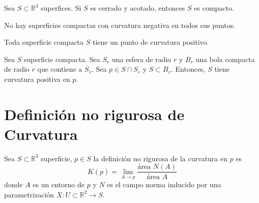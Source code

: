 \begin{defn}
  Sea $S \subset \mathbb{R}^{3}$ superfices. Si $S$ es cerrado y acotado, entonces $S$ es compacto. 
\end{defn}

\begin{prop}
  No hay superficies compactas con curvatura negativa en todos sus puntos.
\end{prop}

\begin{dem}
\end{dem}

\begin{prop}
  Toda superficie compacta $S$ tiene un punto de curvatura positivo.
\end{prop}

\begin{prop}
  Sea $S$ superficie compacta. Sea $S_{r}$ una esfera de radio $r$ y $B_{r}$ una bola compacta de radio $r$ que contiene a $S_{r}$. Sea $ p \in S \cap S_{r}$ y $ S \subset B_{r}$. Entonces, $S$ tiene curvatura positiva en $p$.
\end{prop}

\section{Definición no rigurosa de Curvatura}

\begin{nota}
  Sea $S \subset \mathbb{R}^{3}$ superficie, $p \in S$ la definición no rigurosa de la curvatura en $p$ es
  \[ 
    K(p) = \lim_{A \to p} \frac{\text{área } N(A)}{\text{área } A}
  \] 
  donde $A$ es un entorno de $p$ y $N$ es el campo norma inducido por una parametrización $X : U \subset \mathbb{R}^{2} \to S$.
\end{nota}

